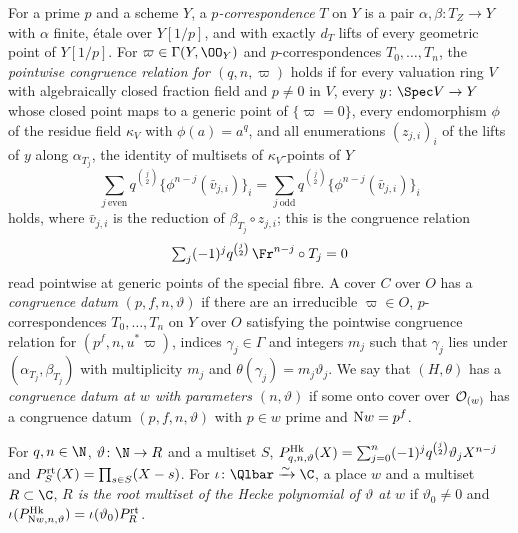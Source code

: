 \begin{definition}\label{pf:steps1:def:cong}
For a prime $p$ and a scheme $Y$, a \emph{$p$-correspondence} $T$ on $Y$ is a pair
$\alpha,\beta\colon T_Z\to Y$ with $\alpha$ finite, \'etale over $Y[1/p]$, and with exactly $d_T$ lifts of
every geometric point of $Y[1/p]$. For $\varpi\in\Gamma(Y,\OO_Y)$ and $p$-correspondences
$T_0,\dots,T_n$, the \emph{pointwise congruence relation for $(q,n,\varpi)$} holds if for every valuation
ring $V$ with algebraically closed fraction field and $p\ne0$ in $V$, every $y\colon\Spec V\to Y$ whose
closed point maps to a generic point of $\{\varpi=0\}$, every endomorphism $\phi$ of the residue field
$\kappa_V$ with $\phi(a)=a^q$, and all enumerations $(z_{j,i})_i$ of the lifts of $y$ along $\alpha_{T_j}$,
the identity of multisets of $\kappa_V$-points of $Y$
\[
 \sum_{j\ \mathrm{even}}q^{\binom j2}\bigl\{\phi^{n-j}(\bar v_{j,i})\bigr\}_i
 =\sum_{j\ \mathrm{odd}}q^{\binom j2}\bigl\{\phi^{n-j}(\bar v_{j,i})\bigr\}_i
\]
holds, where $\bar v_{j,i}$ is the reduction of $\beta_{T_j}\circ z_{j,i}$; this is the congruence relation
\[
 \textstyle\sum_j(-1)^jq^{\binom j2}\,\Fr^{n-j}\circ T_j=0
\]
read pointwise at generic points of the special fibre. A
cover $C$ over $O$ has a \emph{congruence datum} $(p,f,n,\vartheta)$ if there are an irreducible
$\varpi\in O$, $p$-correspondences $T_0,\dots,T_n$ on $Y$ over $O$ satisfying the pointwise congruence
relation for $(p^f,n,u^*\varpi)$, indices $\gamma_j\in\Gamma$ and integers $m_j$ such that $\gamma_j$ lies
under $(\alpha_{T_j},\beta_{T_j})$ with multiplicity $m_j$ and $\theta(\gamma_j)=m_j\vartheta_j$. We say that
$(H,\theta)$ has a \emph{congruence datum at $w$ with parameters $(n,\vartheta)$} if some onto cover over
$\mathcal{O}_{(w)}$ has a congruence datum $(p,f,n,\vartheta)$ with $p\in w$ prime and $\mathrm{N}w=p^f$.
 
 
\end{definition}

\begin{definition}\label{pf:steps1:def:heckepol}
For $q,n\in\N$, $\vartheta\colon\N\to R$ and a multiset $S$,
$P^{\mathrm{Hk}}_{q,n,\vartheta}(X)=\sum_{j=0}^n(-1)^jq^{\binom j2}\vartheta_jX^{n-j}$ and
$P^{\mathrm{rt}}_S(X)=\prod_{s\in S}(X-s)$. For $\iota\colon\Qlbar\xrightarrow\sim\C$, a place $w$ and a multiset
$R\subset\C$, \emph{$R$ is the root multiset of the Hecke polynomial of $\vartheta$ at $w$} if
$\vartheta_0\ne0$ and $\iota(P^{\mathrm{Hk}}_{\mathrm{N}w,n,\vartheta})=\iota(\vartheta_0)P^{\mathrm{rt}}_R$.
 
\end{definition}

